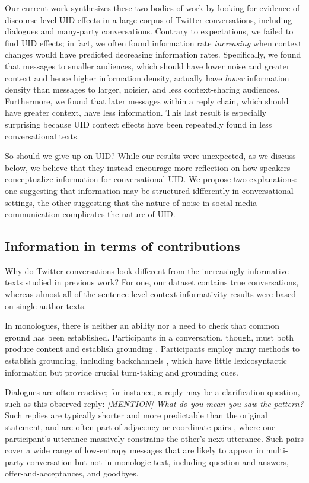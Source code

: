 \documentclass[11pt,letterpaper]{article}
\begin{document}
Our current work synthesizes these two bodies of work by looking for evidence of discourse-level UID effects in a large corpus of Twitter conversations, including dialogues and many-party conversations.  Contrary to expectations, we failed to find UID effects; in fact, we often found information rate \emph{increasing} when context changes would have predicted decreasing information rates.  Specifically, we found that messages to smaller audiences, which should have lower noise and greater context and hence higher information density, actually have \emph{lower} information density than messages to larger, noisier, and less context-sharing audiences. Furthermore, we found that later messages within a reply chain, which should have greater context, have less information.  This last result is especially surprising because UID context effects have been repeatedly found in less conversational texts.

So should we give up on UID? While our results were unexpected, as we discuss below, we believe that they instead encourage more reflection on how speakers conceptualize information for conversational UID. We propose two explanations: one suggesting that information may be structured idfferently in conversational settings, the other suggesting that the nature of noise in social media communication complicates the nature of UID.

\subsection{Information in terms of contributions}

Why do Twitter conversations look different from the increasingly-informative texts studied in previous work? For one, our dataset contains true conversations, whereas almost all of the sentence-level context informativity results were based on single-author texts. 

In monologues, there is neither an ability nor a need to check that common ground has been established. Participants in a conversation, though, must both produce content and establish grounding \cite{clark1987}. Participants employ many methods to establish grounding, including backchannels \cite{yngve1970,schegloff1982,iwasaki1997}, which have little lexicosyntactic information but provide crucial turn-taking and grounding cues.

Dialogues are often reactive; for instance, a reply may be a clarification question, such as this observed reply: {\it [MENTION] What do you mean you saw the pattern?}  Such replies are typically shorter and more predictable than the original statement, and are often part of adjacency or coordinate pairs \cite{schegloff1973,clark1981}, where one participant's utterance massively constrains the other's next utterance. Such pairs cover a wide range of low-entropy messages that are likely to appear in multi-party conversation but not in monologic text, including question-and-answers, offer-and-acceptances, and goodbyes.
\end{document}
